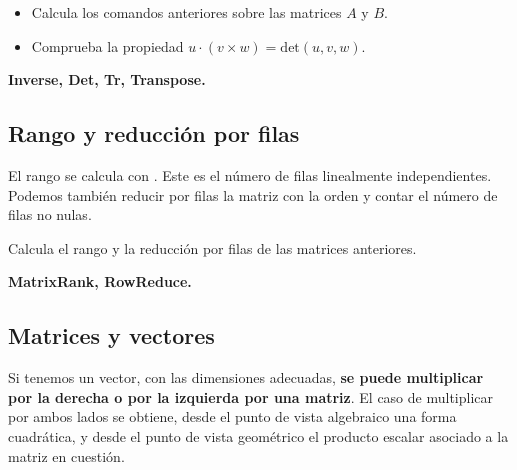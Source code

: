 \documentclass[a4paper,10pt, draft]{article}
\newcommand{\com}[1]{\textbf{\color{blue}{#1}}}
\newenvironment{ejer}{\begin{tcolorbox}[center title, title=Ejercicios,
fonttitle=\sffamily\bfseries,colback=blue!5,colframe=orange]}{\end{tcolorbox}}
\newenvironment{funciones}{\begin{tcolorbox}[center title, title=Nuevas funciones, fonttitle=\sffamily\bfseries, colback=green!5!white,colframe=red!75!black]}{\end{tcolorbox}\bigskip}
\begin{document}
\begin{ejer}

\begin{itemize}

\item Calcula los comandos anteriores sobre las matrices $A$ y $B$.

\item Comprueba la propiedad $u\cdot (v \times w)= \mathrm{det}(u,v,w)$.

\end{itemize}

\end{ejer}  

\begin{funciones}


\textbf{Inverse, Det, Tr, Transpose.}

\end{funciones}


\newpage

\subsection{Rango y reducción por filas}

El rango se calcula con \com{MatrixRank[A]}. Este es el número de filas linealmente independientes. Podemos también reducir por filas la matriz con la orden \com{RowReduce[A]} y contar el número de filas no nulas.

\begin{ejer}

Calcula el rango y la reducción por filas de las matrices anteriores.

\end{ejer}  

\begin{funciones}

\textbf{MatrixRank, RowReduce.}


\end{funciones}


\newpage

\subsection{Matrices y vectores}

Si tenemos un vector, con las dimensiones adecuadas, \textbf{se puede multiplicar por la derecha o por la izquierda por una matriz}. El caso de multiplicar por ambos lados se obtiene, desde el punto de vista algebraico una forma cuadrática, y desde el punto de vista geométrico el producto escalar asociado a la matriz en cuestión.
\end{document}
